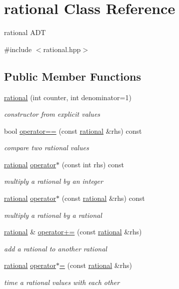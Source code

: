 \hypertarget{classrational}{}\section{rational Class Reference}
\label{classrational}


rational A\+DT  




{\ttfamily \#include $<$rational.\+hpp$>$}

\subsection*{Public Member Functions}
\begin{DoxyCompactItemize}
\item 
\hyperlink{classrational_a5f971ef33181044f54d8e4fee71cb957}{rational} (int counter, int denominator=1)
\begin{DoxyCompactList}\small\item\em constructor from explicit values \end{DoxyCompactList}\item 
bool \hyperlink{classrational_a8b565720ea15ddfb17ea202e27698478}{operator==} (const \hyperlink{classrational}{rational} \&rhs) const
\begin{DoxyCompactList}\small\item\em compare two rational values \end{DoxyCompactList}\item 
\hyperlink{classrational}{rational} \hyperlink{classrational_a9c0f08f8be5db907dc6d93ad3f5cb26b}{operator$\ast$} (const int rhs) const
\begin{DoxyCompactList}\small\item\em multiply a rational by an integer \end{DoxyCompactList}\item 
\hyperlink{classrational}{rational} \hyperlink{classrational_a1dd39ab2daf08ee68087fdbb37be258e}{operator$\ast$} (const \hyperlink{classrational}{rational} \&rhs) const
\begin{DoxyCompactList}\small\item\em multiply a rational by a rational \end{DoxyCompactList}\item 
\hyperlink{classrational}{rational} \& \hyperlink{classrational_a9b83ad0c803d2ac242b42e71d954a356}{operator+=} (const \hyperlink{classrational}{rational} \&rhs)
\begin{DoxyCompactList}\small\item\em add a rational to another rational \end{DoxyCompactList}\item 
\hyperlink{classrational}{rational} \hyperlink{classrational_a2b5729aef261d16cd18ff7c7fcbf8c6e}{operator$\ast$=} (const \hyperlink{classrational}{rational} \&rhs)
\begin{DoxyCompactList}\small\item\em time a rational values with each other \end{DoxyCompactList}\end{DoxyCompactItemize}
